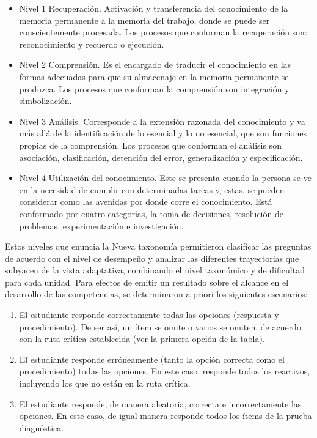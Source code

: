 \documentclass[spanish]{textolivre}
\begin{document}
\begin{itemize}
\item Nivel 1 Recuperación. Activación y transferencia del conocimiento de la memoria permanente a la memoria del trabajo, donde se puede ser conscientemente procesada. Los procesos que conforman la recuperación son: reconocimiento y recuerdo o ejecución. 
\item Nivel 2 Comprensión. Es el encargado de traducir el conocimiento en las formas adecuadas para que su almacenaje en la memoria permanente se produzca. Los procesos que conforman la comprensión son integración y simbolización.
\item Nivel 3 Análisis. Corresponde a la extensión razonada del conocimiento y va más allá de la identificación de lo esencial y lo no esencial, que son funciones propias de la comprensión. Los procesos que conforman el análisis son asociación, clasificación, detención del error, generalización y especificación.
\item Nivel 4 Utilización del conocimiento. Este se presenta cuando la persona se ve en la necesidad de cumplir con determinadas tareas y, estas, se pueden considerar como las avenidas por donde corre el conocimiento. Está conformado por cuatro categorías, la toma de decisiones, resolución de problemas, experimentación e investigación.
\end{itemize}

Estos niveles que enuncia la Nueva taxonomía \cite{marzano2008} permitieron clasificar las preguntas de acuerdo con el nivel de desempeño y analizar las diferentes trayectorias que subyacen de la vista adaptativa, combinando el nivel taxonómico y de dificultad para cada unidad. Para efectos de emitir un resultado sobre el alcance en el desarrollo de las competencias, se determinaron a priori los siguientes escenarios: 

\begin{enumerate}
    \item El estudiante responde correctamente todas las opciones (respuesta y procedimiento). De ser así, un ítem se omite o varios se omiten, de acuerdo con la ruta crítica establecida (ver la primera opción de la tabla). 
\item El estudiante responde erróneamente (tanto la opción correcta como el procedimiento) todas las opciones. En este caso, responde todos los reactivos, incluyendo los que no están en la ruta crítica.  
\item El estudiante responde, de manera aleatoria, correcta e incorrectamente las opciones. En este caso, de igual manera responde todos los ítems de la prueba diagnóstica. 
\end{enumerate}
\end{document}
